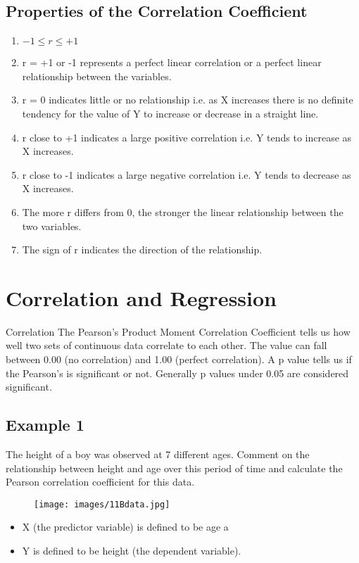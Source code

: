 \documentclass[]{report}
\begin{document}


\subsection{Properties of the Correlation Coefficient}
\begin{enumerate}
	\item $-1 \leq r \leq +1$
	\item r = +1 or -1 represents a perfect linear correlation or a perfect linear
	relationship between the variables.
	\item r = 0 indicates little or no relationship i.e. as X increases there is no
	definite tendency for the value of Y to increase or decrease in a straight line.
	\item r close to +1 indicates a large positive correlation i.e. Y tends to increase
	as X increases.
	\item r close to -1 indicates a large negative correlation i.e. Y tends to decrease
	as X increases.
	\item The more r differs from 0, the stronger the linear relationship between the
	two variables.
	\item The sign of r indicates the direction of the relationship.
\end{enumerate}


\section{Correlation and Regression}
Correlation
The Pearson's Product Moment Correlation Coefficient tells us how well two sets of continuous data correlate to each other. The value can fall between 0.00 (no correlation) and 1.00 (perfect correlation). A p value tells us if the Pearson's is significant or not. Generally p values under 0.05 are considered significant.

\subsection{Example 1}

The height of a boy was observed at 7 different ages.
Comment on the relationship between height and age over this
period of time and calculate the Pearson correlation coefficient for
this data.
\begin{figure}
	\texttt{[image: images/11Bdata.jpg]}\\
	
\end{figure}
\begin{itemize}
	\item X (the predictor variable) is defined to be age a
	\item Y is defined
	to be height (the dependent variable).
\end{itemize}
\end{document}
